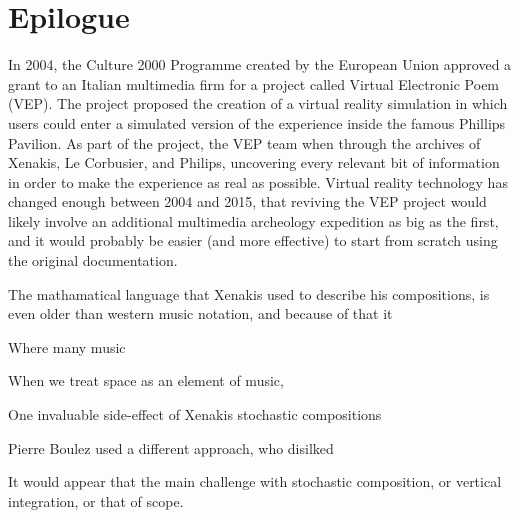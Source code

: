 \clearpage
\chapter{Epilogue}
\label{ch:epilogue}

In 2004, the Culture 2000 Programme created by the European Union
approved a grant to an Italian multimedia firm for a project called
Virtual Electronic Poem (VEP).\cite{eu2004} The project proposed the
creation of a virtual reality simulation in which users could enter a
simulated version of the experience inside the famous Phillips
Pavilion. As part of the project, the VEP team when through the
archives of Xenakis, Le Corbusier, and Philips, uncovering every
relevant bit of information in order to make the experience as real as
possible.\cite{Lombardo2009} Virtual reality technology has changed
enough between 2004 and 2015, that reviving the VEP project would
likely involve an additional multimedia archeology expedition as big
as the first, and it would probably be easier (and more effective) to
start from scratch using the original documentation. 

The mathamatical language that Xenakis used to describe his
compositions, is even older than western music notation, and because
of that it 

Where many music 

When we treat space as an element of music, 


One invaluable side-effect of Xenakis stochastic compositions 


Pierre Boulez used a different approach, who disilked 

It would appear that the main challenge with stochastic composition,
or vertical integration, or that of scope. 



